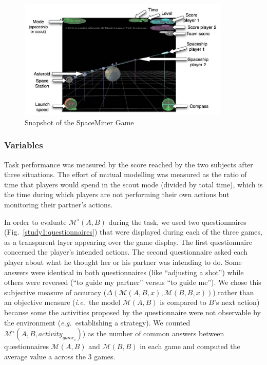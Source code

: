 \documentclass[twocolumn]{article}
\newcommand{\ie}{{\textit{i.e.\ }}}
\newcommand{\eg}{{\textit{e.g.\ }}}
\newcommand{\M}[3]{{\mathcal{M}(#1, #2, #3)}}
\newcommand{\gmodel}[2]{{$\mathcal{M}(#1, #2)$}}
\newcommand{\Model}[3]{{$\mathcal{M}^{\circ}(#1, #2, #3)$}}
\newcommand{\gModel}[2]{{$\mathcal{M}^{\circ}(#1, #2)$}}
\begin{document}
\begin{figure}
        \centering
        \includegraphics[width=0.9\textwidth]{image4.png}
        \caption{Snapshot of the SpaceMiner Game}
        \label{study1:spaceminer}
\end{figure}

\subsubsection*{Variables}

Task performance was measured by the score reached by the two subjects after
three situations. The effort of mutual modelling was measured as the ratio of
time that players would spend in the scout mode (divided by total time), which
is the time during which players are not performing their own actions but
monitoring their partner's actions.

In order to evaluate \gModel{A}{B} during the task, we used two questionnaires
(Fig.~\ref{study1:questionnaires}) that were displayed during each of the three
games, as a transparent layer appearing over the game display. The first
questionnaire concerned the player's intended actions. The second questionnaire
asked each player about what he thought her or his partner was intending to do.
Some answers were identical in both questionnaires (like ``adjusting a shot'')
while others were reversed (``to guide my partner'' versus ``to guide me''). We
chose this subjective measure of accuracy ($\Delta(\M{A}{B}{x}, \M{B}{B}{x})$)
rather than an objective measure (\ie the model \gmodel{A}{B} is compared to $B$'s
next action) because some the activities proposed by the questionnaire were not
observable by the environment (\eg establishing a strategy). We counted
\Model{A}{B}{activity_{game_{i}}}) as the number of common answers between
questionnaires \gmodel{A}{B} and \gmodel{B}{B} in each game and computed the
average value a across the 3 games.
\end{document}
